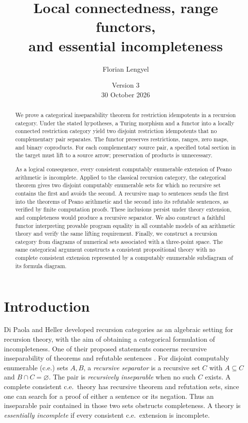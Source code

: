 \documentclass[11pt]{article}
\title{Local connectedness, range functors,\\
and essential incompleteness}
\author{Florian Lengyel}
\date{Version 3\\30 October 2026}
\begin{document}
\maketitle

\begin{abstract}
We prove a categorical inseparability theorem for restriction idempotents
in a recursion category. Under the stated hypotheses, a Turing morphism
and a functor into a locally connected restriction category yield two
disjoint restriction idempotents that no complementary pair separates.
The functor preserves restrictions, ranges, zero maps, and binary
coproducts. For each complementary source pair, a specified total
section in the target must lift to a source arrow; preservation of
products is unnecessary.

As a logical consequence, every consistent computably enumerable
extension of Peano arithmetic is incomplete. Applied to the classical
recursion category, the categorical theorem gives two disjoint
computably enumerable sets for which no recursive set contains the first
and avoids the second. A recursive map to sentences sends the first
into the theorems of Peano arithmetic and the second into its refutable
sentences, as verified by finite computation proofs. These inclusions
persist under theory extension, and completeness would produce a
recursive separator.
We also construct a faithful functor interpreting provable program
equality in all countable models of an arithmetic theory and verify
the same lifting requirement.
Finally, we construct a recursion category from diagrams of numerical
sets associated with a three-point space. The same categorical argument
constructs a consistent propositional theory with no complete consistent
extension represented by a computably enumerable subdiagram of its
formula diagram.
\end{abstract}

\section{Introduction}

Di Paola and Heller developed recursion categories as an algebraic
setting for recursion theory, with the aim of obtaining a categorical
formulation of incompleteness. One of their proposed statements
concerns recursive inseparability of theorems and refutable sentences
\cite[pp.~594--595]{DPH}.
For disjoint computably enumerable (c.e.) sets $A,B$, a \emph{recursive
separator} is a recursive set $C$ with $A\subseteq C$ and
$B\cap C=\varnothing$. The pair is \emph{recursively inseparable}
when no such $C$ exists. A complete consistent c.e.\ theory has
recursive theorem and refutation sets, since one can search for a
proof of either a sentence or its negation. Thus an inseparable pair
contained in those two sets obstructs completeness. A theory is
\emph{essentially incomplete} if every consistent c.e.\ extension
is incomplete.
\end{document}
